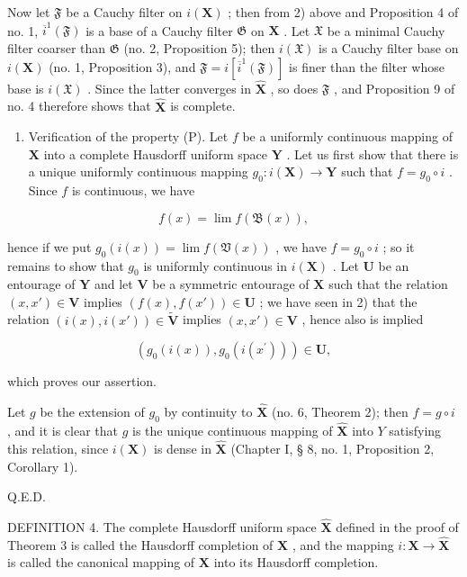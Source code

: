 Now let \(\mathfrak{F}\) be a Cauchy filter on \(i(\mathbf{X})\) ; then from 2) above and Proposition 4 of no. 1, \(\overline{i}^{1}(\mathfrak{F})\) is a base of a Cauchy filter \(\mathfrak{G}\) on \(\mathbf{X}\) . Let \(\mathfrak{X}\) be a minimal Cauchy filter coarser than \(\mathfrak{G}\) (no. 2, Proposition 5); then \(i(\mathfrak{X})\) is a Cauchy filter base on \(i(\mathbf{X})\) (no. 1, Proposition 3), and \(\mathfrak{F}=i[\overline{i}^{1}(\mathfrak{F})]\) is finer than the filter whose base is \(i(\mathfrak{X})\) . Since the latter converges in \(\hat{\mathbf{X}}\) , so does \(\mathfrak{F}\) , and Proposition 9 of no. 4 therefore shows that \(\hat{\mathbf{X}}\) is complete.

\begin{enumerate}
\def\labelenumi{\arabic{enumi})}
\setcounter{enumi}{3}
\tightlist
\item
  Verification of the property (P). Let \(f\) be a uniformly continuous mapping of \(\mathbf{X}\) into a complete Hausdorff uniform space \(\mathbf{Y}\) . Let us first show that there is a unique uniformly continuous mapping \(g_{0}: i(\mathbf{X}) \to \mathbf{Y}\) such that \(f = g_{0} \circ i\) . Since \(f\) is continuous, we have
\end{enumerate}

\[
f (x) = \lim f (\mathfrak {B} (x)),
\]

hence if we put \(g_0(i(x)) = \lim f(\mathfrak{V}(x))\) , we have \(f = g_0 \circ i\) ; so it remains to show that \(g_0\) is uniformly continuous in \(i(\mathbf{X})\) . Let \(\mathbf{U}\) be an entourage of \(\mathbf{Y}\) and let \(\mathbf{V}\) be a symmetric entourage of \(\mathbf{X}\) such that the relation \((x, x') \in \mathbf{V}\) implies \((f(x), f(x')) \in \mathbf{U}\) ; we have seen in 2) that the relation \((i(x), i(x')) \in \tilde{\mathbf{V}}\) implies \((x, x') \in \mathbf{V}\) , hence also is implied

\[
(g _ {0} (i (x)), g _ {0} (i (x ^ {\prime}))) \in \mathbf {U},
\]

which proves our assertion.

Let \(g\) be the extension of \(g_0\) by continuity to \(\hat{\mathbf{X}}\) (no. 6, Theorem 2); then \(f = g \circ i\) , and it is clear that \(g\) is the unique continuous mapping of \(\hat{\mathbf{X}}\) into \(Y\) satisfying this relation, since \(i(\mathbf{X})\) is dense in \(\hat{\mathbf{X}}\) (Chapter I, § 8, no. 1, Proposition 2, Corollary 1).

Q.E.D.

DEFINITION 4. The complete Hausdorff uniform space \(\hat{\mathbf{X}}\) defined in the proof of Theorem 3 is called the Hausdorff completion of \(\mathbf{X}\) , and the mapping \(i: \mathbf{X} \to \hat{\mathbf{X}}\) is called the canonical mapping of \(\mathbf{X}\) into its Hausdorff completion.


